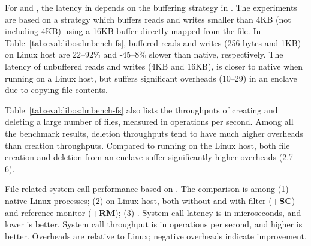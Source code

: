 

For  and ,
the latency in \graphene{} depends on the buffering strategy in \thelibos{}.
The experiments
are based on a strategy which
buffers reads and writes smaller than 4KB (not including 4KB)
using a 16KB buffer directly mapped from the file.
In Table~\ref{tab:eval:libos:lmbench-fs}, buffered reads and writes (256 bytes and 1KB) on Linux host
are 22--92\% and -45--8\% slower than native, respectively.
The latency of unbuffered reads and writes (4KB and 16KB),
is closer to native
when running on a Linux host,
but suffers significant overheads (10--29\x{}) in an enclave due to copying file contents.



Table~\ref{tab:eval:libos:lmbench-fs} also lists the throughputs of creating and deleting a large number of files,
measured in operations per second.
Among all the benchmark results, deletion throughputs tend to have much higher overheads than creation throughputs.
Compared to running on the Linux host, 
both file creation and deletion from an enclave suffer significantly higher overheads
(2.7--6\x{}).

\clearpage
\begin{table}[p]

\caption{File-related system call performance based on \lmbench{}. 
The comparison is among (1) native Linux processes; (2) \graphene{} on Linux host, both without and with \seccomp{} filter ({\bf +SC}) and reference monitor ({\bf +RM}); (3) \graphenesgx{}.
System call latency is in microseconds, and lower is better.
System call throughput is in operations per second, and higher is better. 
Overheads are relative to Linux; negative overheads indicate improvement.} 
\label{tab:eval:libos:lmbench-fs}
\end{table}
\clearpage